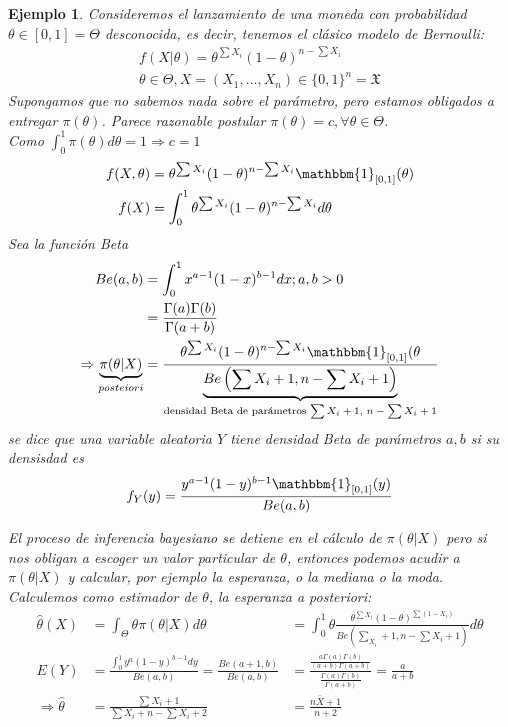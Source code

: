 \documentclass[10pt]{article}
\theoremstyle{plain}
\newtheorem{ej}{Ejemplo}
\theoremstyle{definition}
\begin{document}
\begin{ej}
Consideremos el lanzamiento de una moneda con probabilidad $\theta \in [0,1] = \Theta$ desconocida, es decir, tenemos el clásico modelo de Bernoulli:
\begin{align*}
f(X|\theta) = \theta^{\sum X_{i}}(1-\theta)^{n-\sum X_{i}}\\
\theta\in \Theta, X = (X_{1},\ldots,X_{n}) \in \{0,1\}^n = \mathfrak{X}
\end{align*}
Supongamos que no sabemos nada sobre el parámetro, pero estamos obligados a entregar $\pi(\theta)$. Parece razonable postular $\pi(\theta)=c, \forall \theta\in\Theta$.\\
Como $\int_{0}^{1}\pi(\theta)d\theta = 1 \Rightarrow c = 1$
\begin{align*}
f(X,\theta) &= \theta^{\sum X_{i}} (1-\theta)^{n-\sum X_{i}} \mathbbm{1}_{[0,1]}(\theta)\\
f(X) &= \int_{0}^{1}\theta^{\sum X_{i}}(1-\theta)^{n- \sum X_{i}}d\theta
\end{align*}
Sea la función Beta
\begin{align*}
Be(a,b) &= \int_{0}^{1}x^{a-1}(1-x)^{b-1}dx; a,b>0\\
&= \frac{\Gamma(a)\Gamma(b)}{\Gamma(a+b)}\\
\Rightarrow \underbrace{\pi(\theta|X)}_{posteiori} &= \frac{\theta^{\sum X_{i}}(1-\theta)^{n-\sum X_{i}}\mathbbm{1}_{[0,1]}(\theta}{\underbrace{Be\left(\sum X_{i}+1, n-\sum X_{i}+1\right)}_{\text{densidad Beta de parámetros $\sum X_{i} + 1$, $n-\sum X_{i}+1$}}}
\end{align*}
se dice que una variable aleatoria $Y$ tiene densidad Beta de parámetros $a,b$ si su densisdad es
\begin{align*}
f_{Y}(y) = \frac{y^{a-1}(1-y)^{b-1}\mathbbm{1}_{[0,1]}(y)}{Be(a,b)}
\end{align*}

El proceso de inferencia bayesiano se detiene en el cálculo de $\pi(\theta|X)$ pero si nos obligan a escoger un valor particular de $\theta$, entonces podemos acudir a $\pi(\theta|X)$ y calcular, por ejemplo la esperanza, o la mediana o la moda.\\
Calculemos como estimador de $\theta$, la esperanza a posteriori:
\begin{align*}
\hat{\theta}(X) &= \int_{\Theta}\theta\pi(\theta|X)d\theta &= \int_{0}^{1}\theta \frac{\theta^{\sum X_{i}}(1-\theta)^{\sum(1-X_{i})}}{Be(\sum_{X_{i}}+1,n-\sum X_{i}+1)}d\theta\\
E(Y) &= \frac{\int_{0}^{1}y^a(1-y)^{b-1}dy}{Be(a,b)} = \frac{Be(a+1,b)}{Be(a,b)} &= \frac{\frac{a\Gamma(a)\Gamma(b)}{(a+b)\Gamma(a+b)}}{\frac{\Gamma(a)\Gamma(b)}{\Gamma(a+b)}}= \frac{a}{a+b}\\
\Rightarrow \hat{\theta} &= \frac{\sum X_{i} + 1}{\sum X_{i} + n - \sum X_{i} + 2} &= \frac{n\bar{X}+1}{n+2}
\end{align*}
\end{ej}
\end{document}
